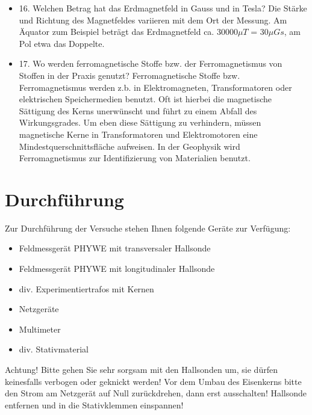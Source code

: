 \begin{itemize}
\item 16. Welchen Betrag hat das Erdmagnetfeld in 
Gauss und in Tesla?
\newline Die Stärke und Richtung des Magnetfeldes variieren mit dem Ort der Messung. 
Am Äquator zum Beispiel beträgt das Erdmagnetfeld ca. 30000$\mu T$ = 30$\mu Gs$, am Pol etwa das Doppelte.
\item 17. Wo werden ferromagnetische Stoffe bzw. der Ferromagnetismus von Stoffen in der Praxis genutzt?
\newline
Ferromagnetische Stoffe bzw. Ferromagnetismus werden z.b. in Elektromagneten, Transformatoren oder elektrischen Speichermedien benutzt. Oft ist hierbei die magnetische Sättigung des Kerns unerwünscht und führt zu einem Abfall des Wirkungsgrades. Um eben diese Sättigung zu verhindern, müssen magnetische Kerne in Transformatoren und Elektromotoren eine Mindestquerschnittsfläche aufweisen. In der Geophysik wird Ferromagnetismus zur Identifizierung von Materialien benutzt. 
\end{itemize}

\section{Durchführung}

Zur Durchführung der Versuche stehen Ihnen folgende Geräte zur Verfügung:
\begin{itemize}
	\item Feldmessgerät PHYWE mit transversaler Hallsonde
	\item Feldmessgerät PHYWE mit longitudinaler Hallsonde
	\item div. Experimentiertrafos mit Kernen
	\item Netzgeräte
	\item Multimeter
	\item div. Stativmaterial
\end{itemize}

Achtung! Bitte gehen Sie sehr sorgsam mit den Hallsonden um, sie dürfen keinesfalls
verbogen oder geknickt werden!
Vor dem Umbau des Eisenkerns bitte den Strom am Netzgerät auf Null zurückdrehen,
dann erst ausschalten!
Hallsonde entfernen und in die Stativklemmen einspannen!

